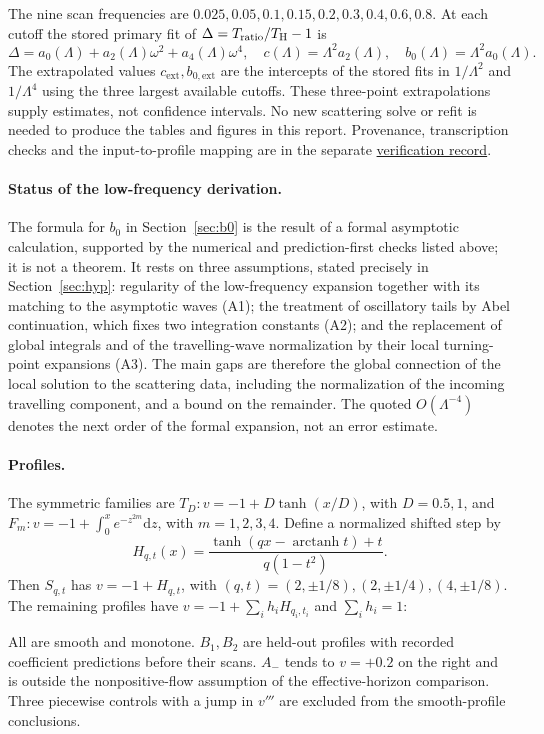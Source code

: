 \documentclass[10pt,a4paper]{article}
\newcommand{\HawkingT}{T_{\mathrm H}}
\newcommand{\cext}{c_{\mathrm{ext}}}
\newcommand{\bext}{b_{0,\mathrm{ext}}}
\newcommand{\dd}{\mathrm d}
\begin{document}
The nine scan frequencies are $0.025,0.05,0.1,0.15,0.2,0.3,0.4,0.6,0.8$.
At each cutoff the stored primary fit of $\Delta=T_{\rm ratio}/\HawkingT-1$ is
\begin{equation}
 \Delta=a_0(\Lambda)+a_2(\Lambda)\omega^2+a_4(\Lambda)\omega^4,
 \quad c(\Lambda)=\Lambda^2 a_2(\Lambda),\quad
 b_0(\Lambda)=\Lambda^2 a_0(\Lambda).
 \label{eq:fit}
\end{equation}
The extrapolated values $\cext,\bext$ are the intercepts of the stored fits
in $1/\Lambda^2$ and $1/\Lambda^4$ using the three largest available
cutoffs. These three-point extrapolations supply estimates, not confidence
intervals. No new scattering solve or refit is needed to produce the
tables and figures in this report. Provenance, transcription checks and
the input-to-profile mapping are in the separate
\href{VERIFICATION-RECORD.md}{verification record}.

\paragraph{Status of the low-frequency derivation.}
The formula for $b_0$ in Section~\ref{sec:b0} is the result of a formal
asymptotic calculation, supported by the numerical and prediction-first
checks listed above; it is not a theorem. It rests on three assumptions,
stated precisely in Section~\ref{sec:hyp}: regularity of the low-frequency
expansion together with its matching to the asymptotic waves (A1); the
treatment of oscillatory tails by Abel continuation, which fixes two
integration constants (A2); and the replacement of global integrals and of
the travelling-wave normalization by their local turning-point expansions
(A3). The main gaps are therefore the global connection of the local
solution to the scattering data, including the normalization of the
incoming travelling component, and a bound on the remainder. The quoted
$O(\Lambda^{-4})$ denotes the next order of the formal expansion, not an
error estimate.

\paragraph{Profiles.}
The symmetric families are $T_D: v=-1+D\tanh(x/D)$, with $D=0.5,1$, and
$F_m: v=-1+\int_0^x e^{-z^{2m}}\dd z$, with $m=1,2,3,4$.
Define a normalized shifted step by
\begin{equation}
 H_{q,t}(x)=\frac{\tanh(qx-\operatorname{arctanh}t)+t}{q(1-t^2)}.
 \label{eq:profile}
\end{equation}
Then $S_{q,t}$ has $v=-1+H_{q,t}$, with $(q,t)=(2,\pm1/8),
(2,\pm1/4),(4,\pm1/8)$. The remaining profiles have
$v=-1+\sum_i h_i H_{q_i,t_i}$ and $\sum_i h_i=1$:
\begin{center}
\small

\end{center}
All are smooth and monotone. $B_1,B_2$ are held-out profiles with recorded
coefficient predictions before their scans. $A_-$ tends to $v=+0.2$ on
the right and is outside the nonpositive-flow assumption of the
effective-horizon comparison. Three piecewise controls with a jump in
$v'''$ are excluded from the smooth-profile conclusions.
\end{document}
